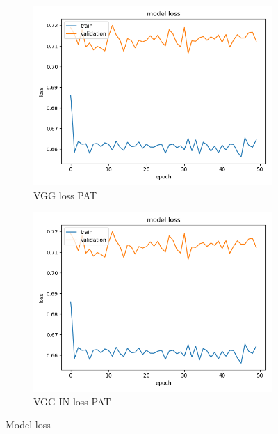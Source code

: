 \begin{figure}[h]
\begin{subfigure}[b]{.24\linewidth}
\includegraphics[width=\linewidth]{Figs/vgg_pat_loss.jpg}
\caption{VGG loss PAT}
\end{subfigure}
\begin{subfigure}[b]{.24\linewidth}
\includegraphics[width=\linewidth]{Figs/vgg_pat_loss.jpg}
\caption{VGG-IN loss PAT}
\end{subfigure}
\caption{Model loss}
\label{fig:loss2}
\end{figure}

